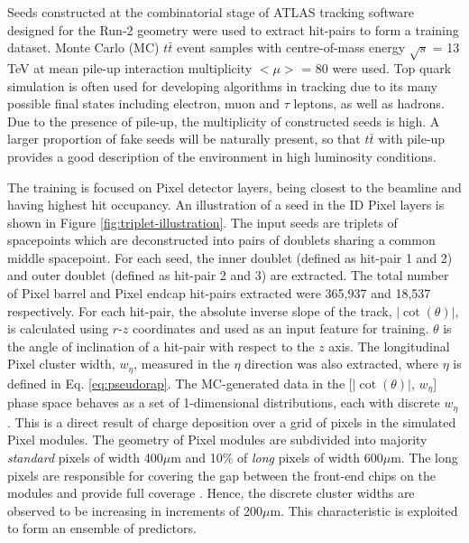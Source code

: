 Seeds constructed at the combinatorial stage of ATLAS tracking software designed for the Run-2 geometry were used to extract hit-pairs to form a training dataset. Monte Carlo (MC) $t\bar{t}$ event samples with centre-of-mass energy $\sqrt{s}$ = 13 TeV at mean pile-up interaction multiplicity $< \mu >$ = 80 were used. Top quark simulation is often used for developing algorithms in tracking due to its many possible final states including electron, muon and $\tau$ leptons, as well as hadrons. Due to the presence of pile-up, the multiplicity of constructed seeds is high. A larger proportion of fake seeds will be naturally present, so that $t\bar{t}$ with pile-up provides a good description of the environment in high luminosity conditions.

The training is focused on Pixel detector layers, being closest to the beamline and having highest hit occupancy. An illustration of a seed in the ID Pixel layers is shown in Figure \ref{fig:triplet-illustration}. The input seeds are triplets of spacepoints which are deconstructed into pairs of doublets sharing a common middle spacepoint. For each seed, the inner doublet (defined as hit-pair 1 and 2) and outer doublet (defined as hit-pair 2 and 3) are extracted. The total number of Pixel barrel and Pixel endcap hit-pairs extracted were 365,937 and 18,537 respectively. For each hit-pair, the absolute inverse slope of the track, $|\cot(\theta)|$, is calculated using $r$-$z$ coordinates and used as an input feature for training. $\theta$ is the angle of inclination of a hit-pair with respect to the $z$ axis. The longitudinal Pixel cluster width, $w_{\eta}$, measured in the $\eta$ direction was also extracted, where $\eta$ is defined in Eq. \ref{eq:pseudorap}. The MC-generated data in the [$|\cot(\theta)|$, $w_{\eta}$] phase space behaves as a set of 1-dimensional distributions, each with discrete $w_{\eta}$. This is a direct result of charge deposition over a grid of pixels in the simulated Pixel modules. The geometry of Pixel modules are subdivided into majority \textit{standard} pixels of width 400$\mu$m and 10\% of \textit{long} pixels of width 600$\mu$m. The long pixels are responsible for covering the gap between the front-end chips on the modules and provide full coverage \cite{pixel-module-dimensions}. Hence, the discrete cluster widths are observed to be increasing in increments of 200$\mu$m. This characteristic is exploited to form an ensemble of predictors. 

